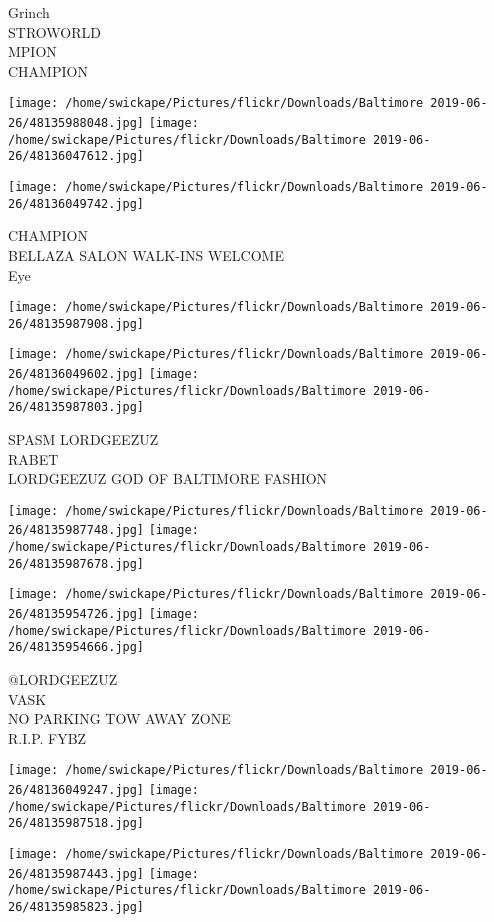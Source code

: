 \documentclass[10pt,letterpaper]{article}
\begin{document}
Grinch\\
STROWORLD\\
MPION\\
CHAMPION
\pagebreak

\texttt{[image: /home/swickape/Pictures/flickr/Downloads/Baltimore 2019-06-26/48135988048.jpg]}
\texttt{[image: /home/swickape/Pictures/flickr/Downloads/Baltimore 2019-06-26/48136047612.jpg]}

\texttt{[image: /home/swickape/Pictures/flickr/Downloads/Baltimore 2019-06-26/48136049742.jpg]}

CHAMPION\\
BELLAZA SALON WALK{-}INS WELCOME\\
Eye
\pagebreak

\texttt{[image: /home/swickape/Pictures/flickr/Downloads/Baltimore 2019-06-26/48135987908.jpg]}

\vspace{0.25in}
\texttt{[image: /home/swickape/Pictures/flickr/Downloads/Baltimore 2019-06-26/48136049602.jpg]}
\texttt{[image: /home/swickape/Pictures/flickr/Downloads/Baltimore 2019-06-26/48135987803.jpg]}

SPASM LORDGEEZUZ\\
RABET\\
LORDGEEZUZ GOD OF BALTIMORE FASHION
\pagebreak

\texttt{[image: /home/swickape/Pictures/flickr/Downloads/Baltimore 2019-06-26/48135987748.jpg]}
\texttt{[image: /home/swickape/Pictures/flickr/Downloads/Baltimore 2019-06-26/48135987678.jpg]}

\texttt{[image: /home/swickape/Pictures/flickr/Downloads/Baltimore 2019-06-26/48135954726.jpg]}
\texttt{[image: /home/swickape/Pictures/flickr/Downloads/Baltimore 2019-06-26/48135954666.jpg]}

@LORDGEEZUZ\\
VASK\\
NO PARKING TOW AWAY ZONE\\
R.I.P. FYBZ
\pagebreak

\texttt{[image: /home/swickape/Pictures/flickr/Downloads/Baltimore 2019-06-26/48136049247.jpg]}
\texttt{[image: /home/swickape/Pictures/flickr/Downloads/Baltimore 2019-06-26/48135987518.jpg]}

\texttt{[image: /home/swickape/Pictures/flickr/Downloads/Baltimore 2019-06-26/48135987443.jpg]}
\texttt{[image: /home/swickape/Pictures/flickr/Downloads/Baltimore 2019-06-26/48135985823.jpg]}
\end{document}
